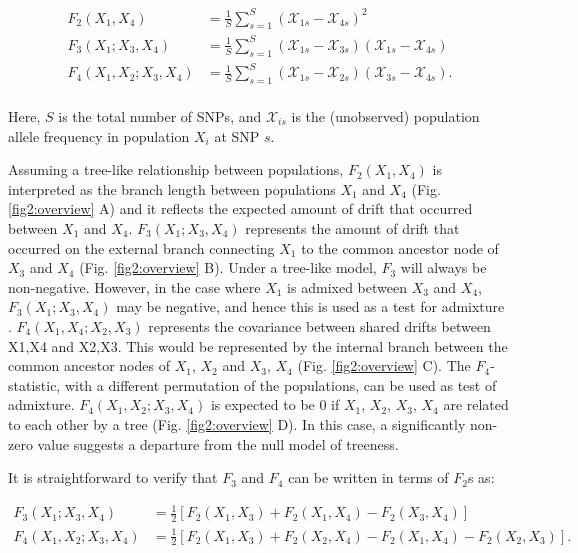 \documentclass[12pt, letterpaper]{article}
\begin{document}
\begin{align}\label{eq:f_intro}
F_2(X_1,X_4) &= \frac{1}{S}\sum_{s=1}^S(\mathcal{X}_{1s} - \mathcal{X}_{4s})^2\nonumber\\
F_3(X_1;X_3,X_4) &= \frac{1}{S}\sum_{s=1}^S(\mathcal{X}_{1s} - \mathcal{X}_{3s})(\mathcal{X}_{1s} - \mathcal{X}_{4s})\nonumber\\
F_4(X_1,X_2;X_3,X_4) &= \frac{1}{S}\sum_{s=1}^S(\mathcal{X}_{1s} - \mathcal{X}_{2s})(\mathcal{X}_{3s} - \mathcal{X}_{4s}).\nonumber\\
\end{align}

Here, $S$ is the total number of SNPs, and $\mathcal{X}_{is}$ is the (unobserved) population allele frequency in population $X_i$ at SNP $s$. 

Assuming a tree-like relationship between populations, $F_2(X_1,X_4)$ is interpreted as the branch length between populations $X_1$ and $X_4$ (Fig. \ref{fig2:overview} A) and it reflects the expected amount of drift that occurred between $X_1$ and $X_4$. $F_3(X_1;X_3,X_4)$ represents the amount of drift that occurred on the external branch connecting $X_1$ to the common ancestor node of $X_3$ and $X_4$ (Fig. \ref{fig2:overview} B). Under a tree-like model, $F_3$ will always be non-negative. However, in the case where $X_1$ is admixed between $X_3$ and $X_4$, $F_3(X_1;X_3,X_4)$ may be negative, and hence this is used as a test for admixture \cite{peter_admixture_2016, patterson_ancient_2012}. $F_4(X_1,X_4;X_2,X_3)$ represents the covariance between shared drifts between X1,X4 and X2,X3. This would be represented by the internal branch between the common ancestor nodes of $X_1$, $X_2$ and $X_3$, $X_4$ (Fig. \ref{fig2:overview} C). The $F_4$- statistic, with a different permutation of the populations, can be used as test of admixture. $F_4(X_1,X_2;X_3,X_4)$ is expected to be 0 if $X_1$, $X_2$, $X_3$, $X_4$ are related to each other by a tree (Fig. \ref{fig2:overview} D). In this case, a significantly non-zero value suggests a departure from the null model of treeness.

It is straightforward to verify that $F_3$ and $F_4$ can be written in terms of $F_2$s as:

\begin{align}\label{eq:f3_f4}
F_3(X_1;X_3,X_4) &= \frac{1}{2} [F_2(X_1,X_3) + F_2(X_1,X_4) - F_2(X_3,X_4)]\nonumber\\
F_4(X_1,X_2;X_3,X_4) &= \frac{1}{2} [F_2(X_1,X_3) + F_2(X_2,X_4) - F_2(X_1,X_4) - F_2(X_2,X_3)]\text{.}
\end{align}
\end{document}
